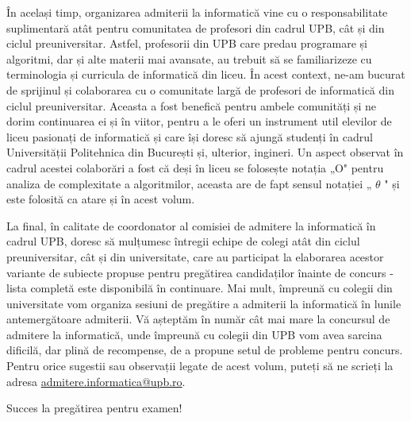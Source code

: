 \documentclass[10pt]{article}
\begin{document}
În același timp, organizarea admiterii la informatică vine cu o responsabilitate suplimentară atât pentru comunitatea de profesori din cadrul UPB, cât și din ciclul preuniversitar. Astfel, profesorii din UPB care predau programare și algoritmi, dar și alte materii mai avansate, au trebuit să se familiarizeze cu terminologia și curricula de informatică din liceu. În acest context, ne-am bucurat de sprijinul și colaborarea cu o comunitate largă de profesori de informatică din ciclul preuniversitar. Aceasta a fost benefică pentru ambele comunități și ne dorim continuarea ei și în viitor, pentru a le oferi un instrument util elevilor de liceu pasionați de informatică și care își doresc să ajungă studenți în cadrul Universității Politehnica din București și, ulterior, ingineri. Un aspect observat în cadrul acestei colaborări a fost că deși în liceu se folosește notația „O" pentru analiza de complexitate a algoritmilor, aceasta are de fapt sensul notației „ $\theta$ " și este folosită ca atare și în acest volum.

La final, în calitate de coordonator al comisiei de admitere la informatică în cadrul UPB, doresc să mulțumesc întregii echipe de colegi atât din ciclul preuniversitar, cât și din universitate, care au participat la elaborarea acestor variante de subiecte propuse pentru pregătirea candidaților înainte de concurs - lista completă este disponibilă în continuare. Mai mult, împreună cu colegii din universitate vom organiza sesiuni de pregătire a admiterii la informatică în lunile antemergătoare admiterii. Vă așteptăm în număr cât mai mare la concursul de admitere la informatică, unde împreună cu colegii din UPB vom avea sarcina dificilă, dar plină de recompense, de a propune setul de probleme pentru concurs. Pentru orice sugestii sau observații legate de acest volum, puteți să ne scrieți la adresa \href{mailto:admitere.informatica@upb.ro}{admitere.informatica@upb.ro}.

Succes la pregătirea pentru examen!
\end{document}
